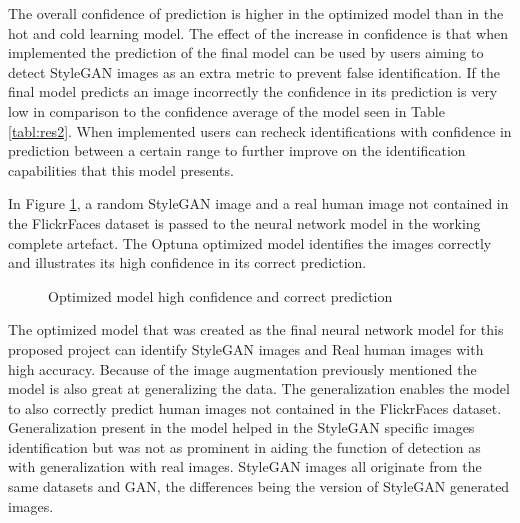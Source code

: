  The overall confidence of prediction is higher in the optimized model than in the hot and cold learning model. The effect of the increase in confidence is that when implemented the prediction of the final model can be used by users aiming to detect StyleGAN images as an extra metric to prevent false identification. If the final model predicts an image incorrectly the confidence in its prediction is very low in comparison to the confidence average of the model seen in Table \ref{tabl:res2}. When implemented users can recheck identifications with confidence in prediction between a certain range to further improve on the identification capabilities that this model presents.

In Figure \ref{fig:rescomp}, a random StyleGAN image and a real human image not contained in the FlickrFaces dataset is passed to the neural network model in the working complete artefact. The Optuna optimized model identifies the images correctly and illustrates its high confidence in its correct prediction. 

\begin{figure}[H]%
\centering
{}%
\caption{Optimized model high confidence and correct prediction}%
\label{fig:rescomp}%
\end{figure}

The optimized model that was created as the final neural network model for this proposed project can identify StyleGAN images and Real human images with high accuracy. Because of the image augmentation previously mentioned the model is also great at generalizing the data. The generalization enables the model to also correctly predict human images not contained in the FlickrFaces dataset. Generalization present in the model helped in the StyleGAN specific images identification but was not as prominent in aiding the function of detection as with generalization with real images. StyleGAN images all originate from the same datasets and GAN, the differences being the version of StyleGAN generated images.  

